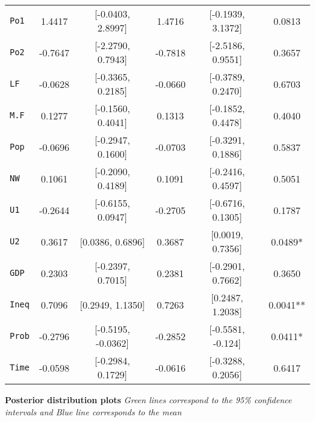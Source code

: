 \documentclass[12pt]{article}
\newenvironment{problem}[2][Problem]{\begin{trivlist}
\item[\hskip \labelsep {\bfseries #1}\hskip \labelsep {\bfseries #2.}]}{\end{trivlist}}
\begin{document}
\begin{problem}{2}
\begin{table}[h]
\begin{tabular}{lcc|ccc}
\multicolumn{1}{l|}{\texttt{Po1}}         & 1.4417  & {[}-0.0403, 2.8997{]}                         & 1.4716  & {[}-0.1939, 3.1372{]}    & 0.0813   \\
\multicolumn{1}{l|}{\texttt{Po2}}         & -0.7647 & {[}-2.2790, 0.7943{]}                         & -0.7818 & {[}-2.5186, 0.9551{]}    & 0.3657   \\
\multicolumn{1}{l|}{\texttt{LF}}          & -0.0628 & {[}-0.3365, 0.2185{]}                         & -0.0660 & {[}-0.3789, 0.2470{]}    & 0.6703   \\
\multicolumn{1}{l|}{\texttt{M.F}}         & 0.1277  & {[}-0.1560, 0.4041{]}                         & 0.1313  & {[}-0.1852, 0.4478{]}    & 0.4040   \\
\multicolumn{1}{l|}{\texttt{Pop}}         & -0.0696 & {[}-0.2947, 0.1600{]}                         & -0.0703 & {[}-0.3291, 0.1886{]}    & 0.5837   \\
\multicolumn{1}{l|}{\texttt{NW}}          & 0.1061  & {[}-0.2090, 0.4189{]}                         & 0.1091  & {[}-0.2416, 0.4597{]}    & 0.5051   \\
\multicolumn{1}{l|}{\texttt{U1}}          & -0.2644 & {[}-0.6155, 0.0947{]}                         & -0.2705 & {[}-0.6716, 0.1305{]}    & 0.1787   \\
\multicolumn{1}{l|}{\texttt{U2}}          & 0.3617  & {[}0.0386, 0.6896{]}                          & 0.3687  & {[}0.0019, 0.7356{]}     & 0.0489*  \\
\multicolumn{1}{l|}{\texttt{GDP}}         & 0.2303  & {[}-0.2397, 0.7015{]}                         & 0.2381  & {[}-0.2901, 0.7662{]}    & 0.3650   \\
\multicolumn{1}{l|}{\texttt{Ineq}}        & 0.7096  & {[}0.2949, 1.1350{]}                          & 0.7263  & {[}0.2487, 1.2038{]}     & 0.0041** \\
\multicolumn{1}{l|}{\texttt{Prob}}        & -0.2796 & {[}-0.5195, -0.0362{]}                        & -0.2852 & {[}-0.5581, -0.124{]}    & 0.0411*  \\
\multicolumn{1}{l|}{\texttt{Time}}        & -0.0598 & {[}-0.2984, 0.1729{]}                         & -0.0616 & {[}-0.3288, 0.2056{]}    & 0.6417  
\end{tabular}
\end{table} 
\begin{flushleft}
\textbf{Posterior distribution plots} \textit{Green lines correspond to the 95\% confidence intervals and Blue line corresponds to the mean}
\end{flushleft}

\end{problem}
\end{document}
